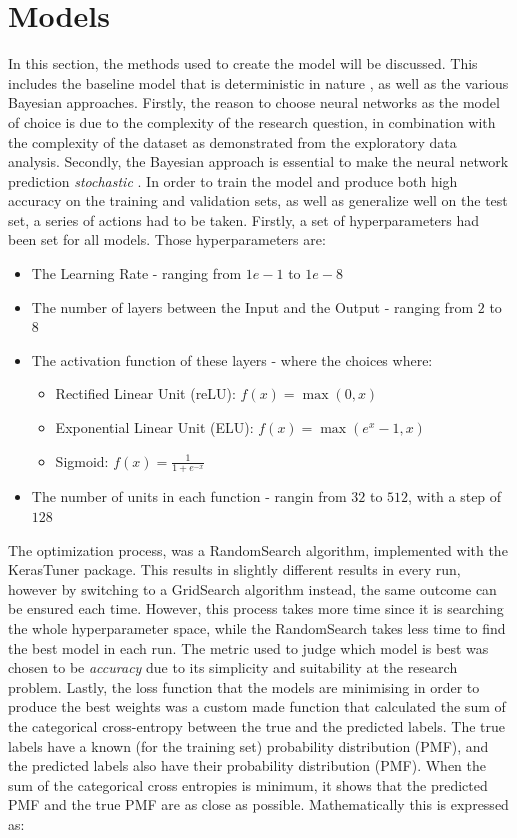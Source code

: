 \documentclass[11pt,twoside]{article}
\numberwithin{Theorem}{section}
\numberwithin{Definition}{section}
\numberwithin{Lemma}{section}
\numberwithin{Algorithm}{section}
\numberwithin{equation}{section}
\begin{document}
\section{Models}
\label{sec:methods}
In this section, the methods used to create the model will be discussed. This includes the baseline model that is deterministic in nature \cite{mlpr}, as well as the various Bayesian approaches. Firstly, the reason to choose neural networks as the model of choice is due to the complexity of the research question, in combination with the complexity of the dataset as demonstrated from the exploratory data analysis. Secondly, the Bayesian approach is essential to make the neural network prediction \textit{stochastic} \cite{tran2018bayesian}.
In order to train the model and produce both high accuracy on the training and validation sets, as well as generalize well on the test set, a series of actions had to be taken. Firstly, a set of hyperparameters had been set for all models. Those hyperparameters are:
\begin{itemize}
\item The Learning Rate - ranging from $1e-1$ to $1e-8$
\item The number of layers between the Input and the Output - ranging from $2$ to $8$
\item The activation function of these layers - where the choices where:
\begin{itemize}
\item Rectified Linear Unit (reLU): $f(x) = \max(0,x)$
\item Exponential Linear Unit (ELU): $f(x) = \max(e^x-1,x)$
\item Sigmoid: $f(x)=\frac{1}{1+e^{-x}}$
\end{itemize}
\item The number of units in each function - rangin from $32$ to $512$, with a step of $128$
\end{itemize}
The optimization process, was a \textsf{RandomSearch} algorithm, implemented with the \textsf{KerasTuner} package. This results in slightly different results in every run, however by switching to a \textsf{GridSearch} algorithm instead, the same outcome can be ensured each time. However, this process takes more time since it is searching the whole hyperparameter space, while the \textsf{RandomSearch} takes less time to find the best model in each run. The metric used to judge which model is best was chosen to be \textit{accuracy} due to its simplicity and suitability at the research problem. Lastly, the loss function that the models are minimising in order to produce the best weights was a custom made function that calculated the sum of the categorical cross-entropy between the true and the predicted labels. The true labels have a known (for the training set) probability distribution (PMF), and the predicted labels also have their probability distribution (PMF). When the sum of the categorical cross entropies is minimum, it shows that the predicted PMF and the true PMF are as close as possible. Mathematically this is expressed as:
\end{document}
